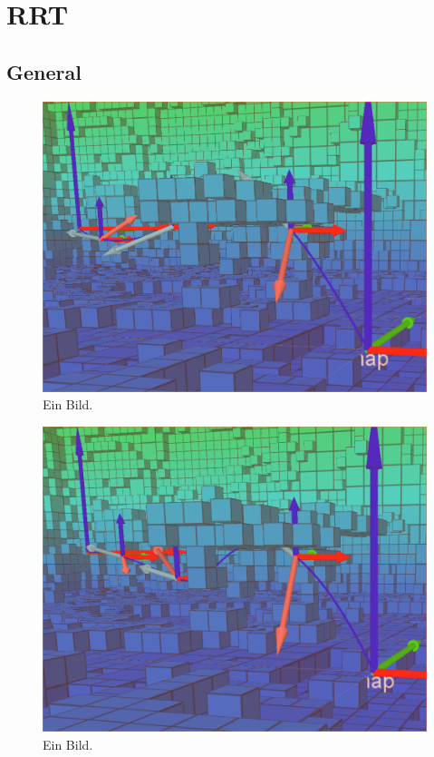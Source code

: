 \chapter{RRT}\label{chap:RRT}

\section{General}


\begin{figure}[h]
   \centering
   \includegraphics[width=1\textwidth]{pics/initialSolution.png}
   \caption{Ein Bild.}
\end{figure}


\begin{figure}[h]
   \centering
   \includegraphics[width=1\textwidth]{pics/Vertex_in_middle_2.png}
   \caption{Ein Bild.}
\end{figure}

